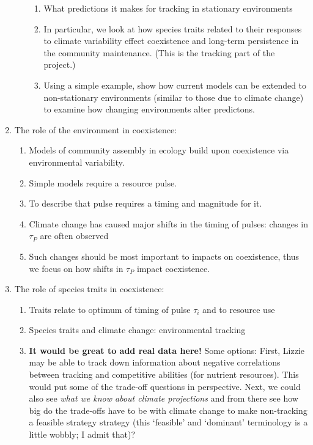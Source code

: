 \documentclass[11pt,letterpaper]{article}
\begin{document}
\begin{enumerate}
\begin{enumerate}
\begin{enumerate}
\item What predictions it makes for tracking in stationary environments
\item In particular, we look at how species traits related to their responses to climate variability effect coexistence and long-term persistence in the community maintenance. (This is the tracking part of the project.) 
\item Using a simple example, show how current models can be extended to non-stationary environments (similar to those due to climate change) to examine how changing environments alter predictons.
\end{enumerate} 
\end{enumerate}
\item The role of the environment in coexistence:
\begin{enumerate}
\item Models of community assembly in ecology build upon coexistence via environmental variability. %
\item Simple models require a resource pulse. 
\item To describe that pulse requires a timing and magnitude for it.  %
\item Climate change has caused major shifts in the timing of pulses: changes in $\tau_{P}$ are often observed 
\item Such changes should be most important to impacts on coexistence, thus we focus on how shifts in $\tau_{P}$ impact coexistence.
\end{enumerate}
\item The role of species traits in coexistence:
\begin{enumerate}
\item Traits relate to optimum of timing of pulse $\tau_{i}$  and to resource use 
\item Species traits and climate change: environmental tracking
\item {\bf It would be great to add real data here!} Some options: First, Lizzie may be able to track down information about negative correlations between tracking and competitive abilities (for nutrient resources). This would put some of the trade-off questions in perspective. Next, we could also see  \emph{what we know about climate projections} and from there see how big do the trade-offs have to be with climate change to make non-tracking a feasible strategy strategy (this `feasible' and `dominant' terminology is a little wobbly; I admit that)? %

\end{enumerate}
\end{enumerate}
\end{document}
